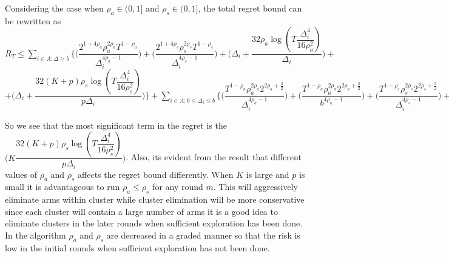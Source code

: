 \begin{remark}
Considering the case when $\rho_{a}\in (0,1]$ and $\rho_{s}\in (0,1]$, the total regret bound can be rewritten as
\newline $R_{T}\leq \sum_{i\in A:\Delta\geq b} \bigg\lbrace \bigg(\dfrac{2^{1+4\rho_{a}}\rho_{a}^{2\rho_{a}}T^{1-\rho_{a}}}{\Delta_{i}^{4\rho_{a}-1}}\bigg) + \bigg(\dfrac{2^{1+4\rho_{s}}\rho_{s}^{2\rho_{s}}T^{1-\rho_{s}}}{\Delta_{i}^{4\rho_{s}-1}}\bigg) + \bigg(\Delta_{i}+\dfrac{32\rho_{a}\log{(T\dfrac{\Delta_{i}^{4}}{16\rho_{a}^{2}})}}{\Delta_{i}}\bigg) +$ \newline $ + \bigg(\Delta_{i}+\dfrac{32(K+p)\rho_{s}\log{(T\dfrac{\Delta_{i}^{4}}{16\rho_{s}^{2}})}}{p\Delta_{i}}\bigg)\bigg\rbrace + \sum_{i\in A:0\leq\Delta_{i}\leq b}\bigg\lbrace \bigg(\dfrac{T^{1-\rho_{a}}\rho_{a}^{2\rho_{a}}2^{2\rho_{a}+\frac{3}{2}}}{\Delta_{i}^{4\rho_{a}-1}} \bigg)+\bigg(\dfrac{T^{1-\rho_{a}}\rho_{a}^{2\rho_{a}}2^{2\rho_{a}+\frac{3}{2}}}{b^{4\rho_{a} -1}} \bigg) +  \bigg(\dfrac{T^{1-\rho_{s}}\rho_{s}^{2\rho_{s}}2^{2\rho_{s}+\frac{3}{2}}}{\Delta_{i}^{4\rho_{s}-1}} \bigg)+\bigg(\dfrac{T^{1-\rho_{s}}\rho_{s}^{2\rho_{s}}2^{2\rho_{s}+\frac{3}{2}}}{b^{4\rho_{s} -1}} \bigg) \bigg\rbrace + max_{i:\Delta\leq b}\Delta_{i}T   $

	So we see that the most significant term in the regret is the $\bigg(K\dfrac{32(K+p)\rho_{s}\log{(T\dfrac{\Delta_{i}^{4}}{16\rho_{s}^{2}})}}{p\Delta_{i}}\bigg)$. Also, its evident from the result that different values of $\rho_{a}$ and $\rho_{s}$ affects the regret bound differently. When $K$ is large and $p$ is small it is advantageous to run $\rho_{a}\leq \rho_{s}$ for any round $m$. This will aggressively eliminate arms within cluster while cluster elimination will be more conservative since each cluster will contain a large number of arms it is a good idea to eliminate clusters in the later rounds when sufficient exploration has been done. In the algorithm $\rho_{a}$ and $\rho_{s}$ are decreased in a graded manner so that the risk is low in the initial rounds when sufficient exploration has not been done.
	
\end{remark}

